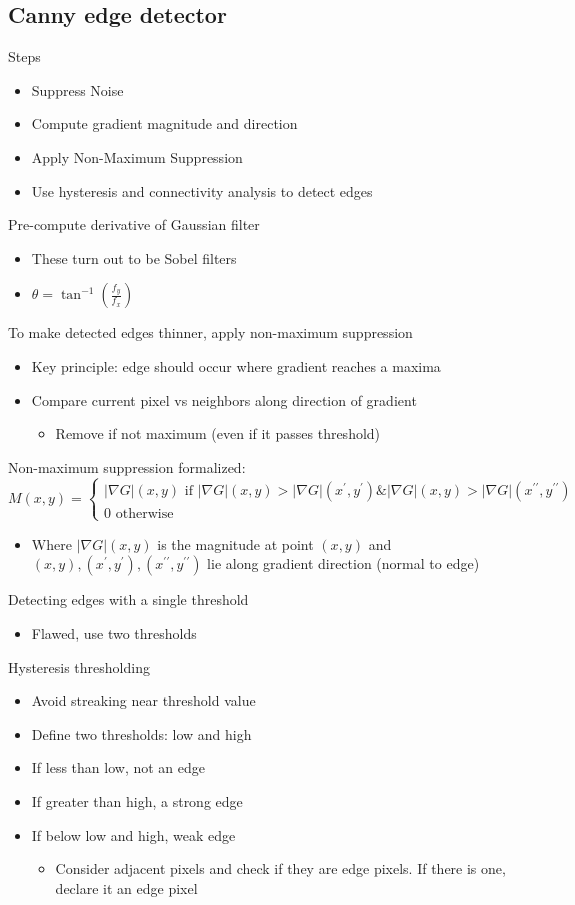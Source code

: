 \subsection{Canny edge detector}
Steps
\begin{itemize}
    \item Suppress Noise
    \item Compute gradient magnitude and direction
    \item Apply Non-Maximum Suppression
    \item Use hysteresis and connectivity analysis to detect edges
\end{itemize}
Pre-compute derivative of Gaussian filter 
\begin{itemize}
    \item These turn out to be Sobel filters
    \item $\theta = \tan^{-1}\left(\frac{f_y}{f_x}\right)$
\end{itemize}
To make detected edges thinner, apply non-maximum suppression
\begin{itemize}
    \item Key principle: edge should occur where gradient reaches a maxima
    \item Compare current pixel vs neighbors along direction of gradient
    \begin{itemize}
        \item Remove if not maximum (even if it passes threshold)
    \end{itemize}
\end{itemize}
Non-maximum suppression formalized:
\[M(x,y) = \begin{cases}
    |\nabla G|(x,y) \text{ if } |\nabla G|(x,y) > |\nabla G|(x^\prime,y^\prime) \& |\nabla G|(x,y) > |\nabla G|(x^{\prime\prime},y^{\prime\prime})\\
    0 \text{ otherwise}
\end{cases}\]
\begin{itemize}
    \item Where $|\nabla G|(x,y)$ is the magnitude at point $(x,y)$ and $(x,y), (x^\prime,y^\prime), (x^{\prime\prime}, y^{\prime\prime})$ lie along gradient direction (normal to edge)
\end{itemize}
Detecting edges with a single threshold
\begin{itemize}
    \item Flawed, use two thresholds
\end{itemize}
Hysteresis thresholding
\begin{itemize}
    \item Avoid streaking near threshold value
    \item Define two thresholds: low and high
    \item If less than low, not an edge
    \item If greater than high, a strong edge
    \item If below low and high, weak edge
    \begin{itemize}
        \item Consider adjacent pixels and check if they are edge pixels. If there is one, declare it an edge pixel
    \end{itemize}
\end{itemize}
